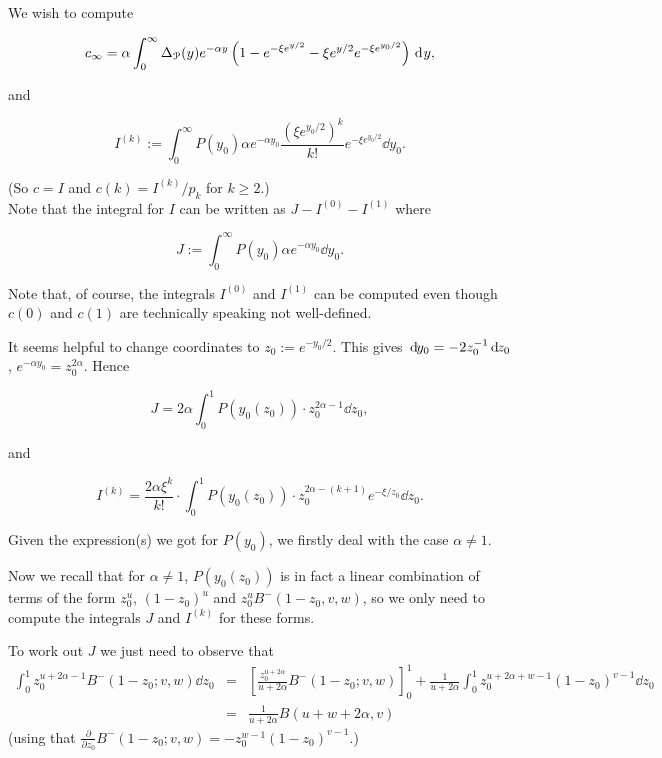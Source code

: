 
We wish to compute

\[   
	c_\infty = \alpha \int_0^{\infty} \Delta_{{\mathcal P}}(y) e^{-\alpha y} \left(1-e^{-\xi e^{y/2}} - \xi e^{y/2} 
	e^{-\xi e^{y_0/2}}\right) \operatorname{\, \mathrm{d}\hspace{-1pt}} y, 
\]

\noindent
and

\[ I^{(k)} := 
\int_0^{\infty} P(y_0) \alpha e^{-\alpha y_0} \frac{\left(\xi e^{y_0/2}\right)^k}{k!} e^{-\xi e^{y_0/2}} {\dd} y_0. \]

\noindent
(So $c = I$ and $c(k) = I^{(k)} / p_k $ for $k\geq 2$.) \\
Note that the integral for $I$ can be written as $J - I^{(0)} - I^{(1)}$ where

\[ J := \int_0^{\infty} P(y_0) \alpha e^{-\alpha y_0} {\dd} y_0. \] 

\noindent
Note that, of course, the integrals $I^{(0)}$ and $I^{(1)}$ can be computed even though $c(0)$ and $c(1)$ are technically
speaking not well-defined.



\noindent
It seems helpful to change coordinates to $z_0 := e^{-y_0/2}$.
This gives ${\operatorname{\, \mathrm{d}\hspace{-1pt}}} y_0 = {{\color{black} -}}2 z_0^{-1} {\operatorname{\, \mathrm{d}\hspace{-1pt}}} z_0$, $e^{-\alpha y_0} = z_0^{2\alpha}$.
Hence 

\[ J = 2 \alpha \int_0^1 P(y_0(z_0)) \cdot z_0^{2\alpha-1} {\dd} z_0, \]

\noindent
and 

\[ I^{(k)} = \frac{2 \alpha \xi^k}{k!} \cdot \int_0^1 P(y_0(z_0)) \cdot z_0^{2\alpha-(k+1)} e^{-\xi/z_0} {\dd} z_0. \]

\noindent
Given the expression(s) we got for $P(y_0)$, we firstly deal with the case $\alpha \not = 1$. %


\noindent
Now we recall that for $\alpha \not =1$, $P(y_0(z_0))$ is in fact a linear combination of terms of the form $z_0^u$, $(1-z_0)^u$ and $z_0^u B^-(1-z_0,v,w)$, so we only need to compute the integrals $J$ and $I^{(k)}$ for these forms.

\vspace{1em}

\noindent
To work out $J$ we just need to observe that 
\[ \begin{array}{rcl} 
\int_0^1 z_0^{u+2\alpha-1} B^-(1-z_0;v,w) {\dd} z_0 
& = & 
\left[ \frac{z_0^{u+2\alpha}}{u+2\alpha} B^-(1-z_0;v,w) \right]_0^1 
+ \frac{1}{u+2\alpha} \int_0^1 z_0^{u+2\alpha+w-1} (1-z_0)^{v-1} {\dd} z_0 \\
& = & 
\frac{1}{u+2\alpha} B(u+w+2\alpha,v)
\end{array} \]
\noindent
(using that $\frac{\partial}{\partial z_0} B^-(1-z_0;v,w) = - z_0^{w-1} (1-z_0)^{v-1}$.)

